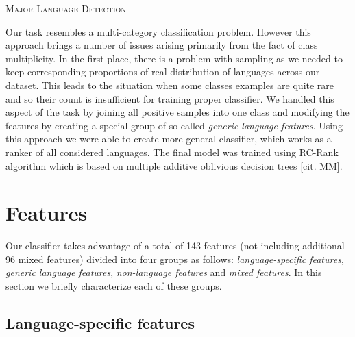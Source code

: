 \documentclass[12pt,a4paper]{article}     %
\begin{document}
  \begin{center}  
    \textsc{\Large Major Language Detection}
  \end{center}

  Our task resembles a multi-category classification problem. 
  However this approach brings a number of issues arising primarily from the fact of class multiplicity. 
  In the first place, there is a problem with sampling as we needed to keep corresponding proportions 
  of real distribution of languages across our dataset. 
  This leads to the situation when some classes examples are quite rare and so their count is insufficient 
  for training proper classifier. We handled this aspect of the task by joining all positive samples 
  into one class and modifying the features by creating a special group of so called \textit{generic language features}. 
  Using this approach we were able to create more general classifier, which works as a ranker of all considered languages. 
  The final model was trained using RC-Rank algorithm which is based on multiple additive oblivious decision trees [cit. MM]. 

  \section{Features}
  Our classifier takes advantage of a total of 143 features (not including additional 96 mixed features) divided into four groups
  as follows: \textit{language-specific features}, \textit{generic language features}, \textit{non-language
  features} and \textit{mixed features}. In this section we briefly characterize each of these
  groups.

  \subsection{Language-specific features}
\end{document}
